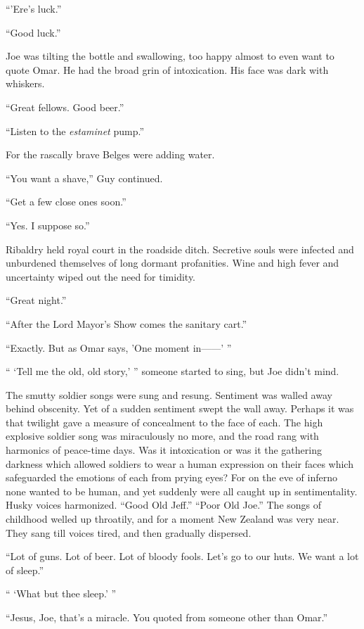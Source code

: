``'Ere's luck.''

``Good luck.''

Joe was tilting the bottle and swallowing, too happy almost to even want to quote Omar. He had the broad grin of intoxication. His face was dark with whiskers.

``Great fellows. Good beer.''

``Listen to the \textit{estaminet} pump.''

For the rascally brave Belges were adding water.

``You want a shave,'' Guy continued.

``Get a few close ones soon.''

``Yes. I suppose so.''

Ribaldry held royal court in the roadside ditch. Secretive souls were infected and unburdened themselves of long dormant profanities. Wine and high fever and uncertainty wiped out the need for timidity.

``Great night.''

``After the Lord Mayor's Show comes the sanitary cart.''

``Exactly. But as Omar says, 'One moment in------' ''

`` `Tell me the old, old story,' '' someone started to sing, but Joe didn't mind.

The smutty soldier songs were sung and resung. Sentiment was walled away behind obscenity. Yet of a sudden sentiment swept the wall away. Perhaps it was that twilight gave a measure of concealment to the face of each. The high explosive soldier song was miraculously no more, and the road rang with harmonics of peace-time days. Was it intoxication or was it the gathering darkness which allowed soldiers to wear a human expression on their faces which safeguarded the emotions of each from prying eyes? For on the eve of inferno none wanted to be human, and yet suddenly were all caught up in sentimentality. Husky voices harmonized. ``Good Old Jeff.'' ``Poor Old Joe.'' The songs of childhood welled up throatily, and for a moment New Zealand was very near. They sang till voices tired, and then gradually dispersed.

``Lot of guns. Lot of beer. Lot of bloody fools. Let's go to our huts. We want a lot of sleep.''

`` `What but thee sleep.' ''

``Jesus, Joe, that's a miracle. You quoted from someone other than Omar.''